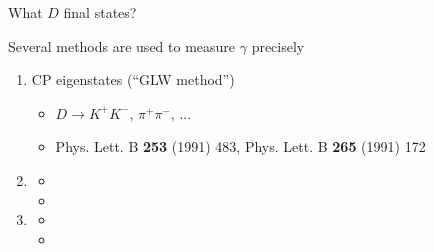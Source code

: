 \documentclass[dvipsnames]{beamer}
\begin{document}
\begin{frame}{What $D$ final states?}
  \begin{center}
    \Large Several methods are used to measure $\gamma$ precisely
  \end{center}
  \vspace{0.2cm}
  \begin{enumerate}
    \setlength\itemsep{1.0em}
    \item{CP eigenstates (``GLW method'')}
    \begin{itemize}
      \item{$D\to K^+K^-$, $\pi^+\pi^-$, ...}
      \item{Phys. Lett. B \textbf{253} (1991) 483, Phys. Lett. B \textbf{265} (1991) 172}
    \end{itemize}
    \item{\phantom{Doubly-Cabibbo Suppressed decays (``ADS method'')}}
    \begin{itemize}
      \item[]{\phantom{$D\to K^-\pi^+$, $K^-\pi^+\pi^-\pi^+$, ...}}
      \item[]{}
    \end{itemize}
    \item{\phantom{Self-conjugate multi-body final states (``BPGGSZ method'')}}
    \begin{itemize}
      \item[]{\phantom{$D\to K_S^0\pi^+\pi^-$, $K_S^0K^+K^-$, ...}}
      \item[]{}
    \end{itemize}
  \end{enumerate}
\end{frame}
\end{document}
